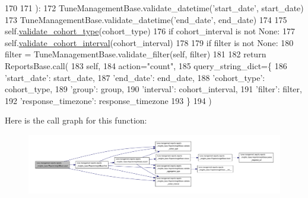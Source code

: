 \begin{DoxyCode}
170 
171     ):
172         TuneManagementBase.validate\_datetime(\textcolor{stringliteral}{'start\_date'}, start\_date)
173         TuneManagementBase.validate\_datetime(\textcolor{stringliteral}{'end\_date'}, end\_date)
174 
175         self.\hyperlink{classtune_1_1management_1_1reports_1_1reports__insights__base_1_1ReportsInsightBase_a78f6a5bfe7258d65e381281510ae9909}{validate\_cohort\_type}(cohort\_type)
176         \textcolor{keywordflow}{if} cohort\_interval \textcolor{keywordflow}{is} \textcolor{keywordflow}{not} \textcolor{keywordtype}{None}:
177             self.\hyperlink{classtune_1_1management_1_1reports_1_1reports__insights__base_1_1ReportsInsightBase_ad46443a32fbdae1590e4dfbeb945c566}{validate\_cohort\_interval}(cohort\_interval)
178 
179         \textcolor{keywordflow}{if} filter \textcolor{keywordflow}{is} \textcolor{keywordflow}{not} \textcolor{keywordtype}{None}:
180             filter = TuneManagementBase.validate\_filter(self, filter)
181 
182         \textcolor{keywordflow}{return} ReportsBase.call(
183             self,
184             action=\textcolor{stringliteral}{"count"},
185             query\_string\_dict=\{
186                 \textcolor{stringliteral}{'start\_date'}: start\_date,
187                 \textcolor{stringliteral}{'end\_date'}: end\_date,
188                 \textcolor{stringliteral}{'cohort\_type'}: cohort\_type,
189                 \textcolor{stringliteral}{'group'}: group,
190                 \textcolor{stringliteral}{'interval'}: cohort\_interval,
191                 \textcolor{stringliteral}{'filter'}: filter,
192                 \textcolor{stringliteral}{'response\_timezone'}: response\_timezone
193             \}
194         )

\end{DoxyCode}


Here is the call graph for this function\-:
\nopagebreak
\begin{figure}[H]
\begin{center}
\leavevmode
\includegraphics[width=350pt]{classtune_1_1management_1_1reports_1_1reports__insights__base_1_1ReportsInsightBase_a6333765e99d27cf78b6f7bac1260e7c1_cgraph}
\end{center}
\end{figure}


